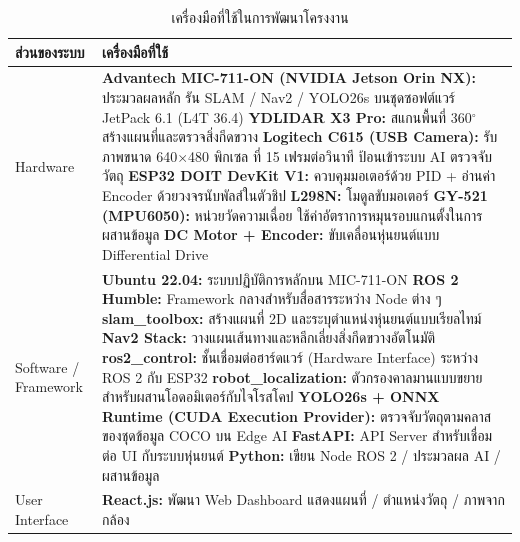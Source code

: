 \documentclass[a4paper,12pt]{report}
\begin{document}
\begin{table}[htbp]
\centering
\caption[เครื่องมือที่ใช้ในการพัฒนาโครงงาน (บทที่ 1)]{เครื่องมือที่ใช้ในการพัฒนาโครงงาน}
\label{tab:tools}
\small
\begin{tabularx}{\textwidth}{|>{\raggedright\arraybackslash}p{3.2cm}|X|}
\hline
\textbf{ส่วนของระบบ} & \textbf{เครื่องมือที่ใช้} \\
\hline
Hardware &
\textbf{Advantech MIC-711-ON (NVIDIA Jetson Orin NX):} ประมวลผลหลัก
รัน SLAM / Nav2 / YOLO26s บนชุดซอฟต์แวร์ JetPack 6.1 (L4T 36.4) \newline
\textbf{YDLIDAR X3 Pro:} สแกนพื้นที่ 360$^\circ$ สร้างแผนที่และตรวจสิ่งกีดขวาง \newline
\textbf{Logitech C615 (USB Camera):} รับภาพขนาด 640$\times$480 พิกเซล ที่ 15 เฟรมต่อวินาที
ป้อนเข้าระบบ AI ตรวจจับวัตถุ \newline
\textbf{ESP32 DOIT DevKit V1:} ควบคุมมอเตอร์ด้วย PID + อ่านค่า Encoder ด้วยวงจรนับพัลส์ในตัวชิป \newline
\textbf{L298N:} โมดูลขับมอเตอร์ \newline
\textbf{GY-521 (MPU6050):} หน่วยวัดความเฉื่อย ใช้ค่าอัตราการหมุนรอบแกนตั้งในการผสานข้อมูล \newline
\textbf{DC Motor + Encoder:} ขับเคลื่อนหุ่นยนต์แบบ Differential Drive \\
\hline
Software / \newline Framework &
\textbf{Ubuntu 22.04:} ระบบปฏิบัติการหลักบน MIC-711-ON \newline
\textbf{ROS 2 Humble:} Framework กลางสำหรับสื่อสารระหว่าง Node ต่าง ๆ \newline
\textbf{slam\_toolbox:} สร้างแผนที่ 2D และระบุตำแหน่งหุ่นยนต์แบบเรียลไทม์ \newline
\textbf{Nav2 Stack:} วางแผนเส้นทางและหลีกเลี่ยงสิ่งกีดขวางอัตโนมัติ \newline
\textbf{ros2\_control:} ชั้นเชื่อมต่อฮาร์ดแวร์ (Hardware Interface) ระหว่าง ROS 2 กับ ESP32 \newline
\textbf{robot\_localization:} ตัวกรองคาลมานแบบขยายสำหรับผสานโอดอมิเตอร์กับไจโรสโคป \newline
\textbf{YOLO26s + ONNX Runtime (CUDA Execution Provider):}
ตรวจจับวัตถุตามคลาสของชุดข้อมูล COCO บน Edge AI \newline
\textbf{FastAPI:} API Server สำหรับเชื่อมต่อ UI กับระบบหุ่นยนต์ \newline
\textbf{Python:} เขียน Node ROS 2 / ประมวลผล AI / ผสานข้อมูล \\
\hline
User Interface &
\textbf{React.js:} พัฒนา Web Dashboard แสดงแผนที่ / ตำแหน่งวัตถุ / ภาพจากกล้อง \newline

\end{tabularx}
\end{table}
\end{document}
